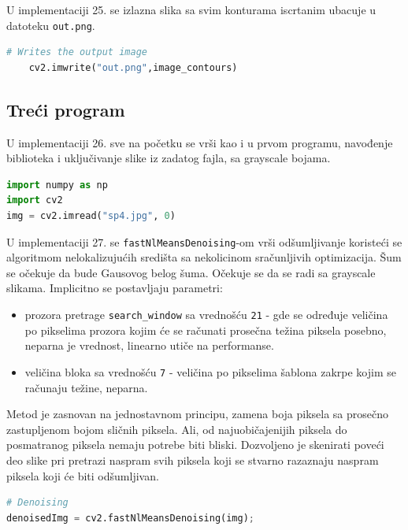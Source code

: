 \documentclass[fontsize=12bp, paper=a4]{scrarticle}
\begin{document}
U implementaciji 25. se izlazna slika sa svim konturama iscrtanim ubacuje u datoteku \texttt{out.png}.

\begin{lstlisting}[language=Python, caption={Izbacivanje fajla rezultujuće slike}]     
    # Writes the output image
    cv2.imwrite("out.png",image_contours)
\end{lstlisting}

\subsection*{Treći program}
U implementaciji 26. sve na početku se vrši kao i u prvom programu, navođenje biblioteka i uključivanje slike iz zadatog fajla, sa grayscale bojama.\cite{stackoverfloweg}
\begin{lstlisting}[language=Python, caption={Učitavanje modula, učitavanje fajla slike}]     
import numpy as np
import cv2
img = cv2.imread("sp4.jpg", 0)
\end{lstlisting}

U implementaciji 27. se \verb|fastNlMeansDenoising|-om vrši odšumljivanje koristeći se algoritmom nelokalizujućih središta sa nekolicinom sračunljivih optimizacija. Šum se očekuje da bude Gausovog belog šuma. Očekuje se da se radi sa grayscale slikama.\cite{denoise} Implicitno se postavljaju parametri:
\begin{itemize}
    \item prozora pretrage \verb|search_window| sa vrednošću \verb|21| - gde se određuje veličina po pikselima prozora kojim će se računati prosečna težina piksela posebno, neparna je vrednost, linearno utiče na performanse.
    \item veličina bloka sa vrednošću \verb|7| - veličina po pikselima šablona zakrpe kojim se računaju težine, neparna.
\end{itemize}

Metod je zasnovan na jednostavnom principu, zamena boja piksela sa prosečno zastupljenom bojom sličnih piksela. Ali, od najuobičajenijih piksela do posmatranog piksela nemaju potrebe biti bliski. Dozvoljeno je skenirati poveći deo slike pri pretrazi naspram svih piksela koji se stvarno razaznaju naspram piksela koji će biti odšumljivan.\cite{denoise2}

\begin{lstlisting}[language=Python, caption={Odšumljivanje}]     
    # Denoising
denoisedImg = cv2.fastNlMeansDenoising(img);
\end{lstlisting}
\end{document}
